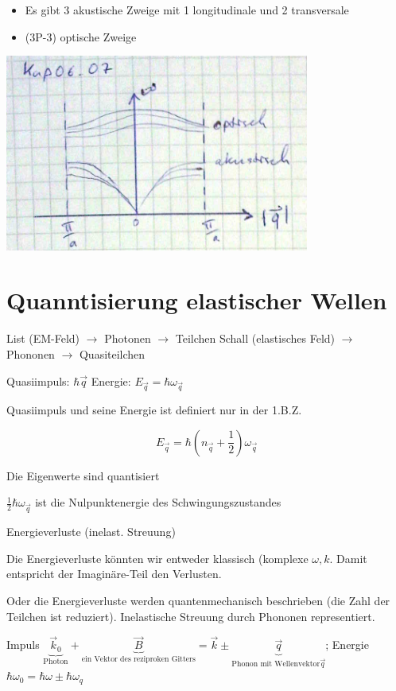 \begin{itemize}
\item Es gibt 3 akustische Zweige mit 1 longitudinale und 2 transversale
\item (3P-3) optische Zweige
\end{itemize}

\includegraphics[width=0.75\textwidth]{kap06_07.png}

\section{Quanntisierung elastischer Wellen}

List (EM-Feld) \(\rightarrow\) Photonen \(\rightarrow\) Teilchen
Schall (elastisches Feld) \(\rightarrow\)  Phononen  \(\rightarrow\) Quasiteilchen

Quasiimpuls: \(\hbar \vec q\)
Energie: \(E_{\vec q}=\hbar \omega_{\vec q}\)

Quasiimpuls und seine Energie ist definiert nur in der 1.B.Z.

\[E_{\vec q}=\hbar(n_{\vec q}+\frac{1}{2})\omega_{\vec q}\]

Die Eigenwerte sind quantisiert

\(\frac{1}{2}\hbar \omega_{\vec q}\) ist die Nulpunktenergie des Schwingungszustandes

Energieverluste (inelast. Streuung)

Die Energieverluste könnten wir entweder klassisch (komplexe \(\omega,k\). Damit entspricht der Imaginäre-Teil den Verlusten. 

Oder die Energieverluste werden quantenmechanisch beschrieben (die Zahl der Teilchen ist reduziert). Inelastische Streuung durch Phononen representiert.

Impuls \(\underbrace{\vec k_0}_{\text{Photon}} + \underbrace{\vec B}_{\text{ein Vektor des reziproken Gitters}} = \vec k \pm \underbrace{\vec q}_{\text{Phonon mit Wellenvektor}\vec q}\); Energie \(\hbar \omega_0=\hbar\omega \pm \hbar \omega_q\) 

